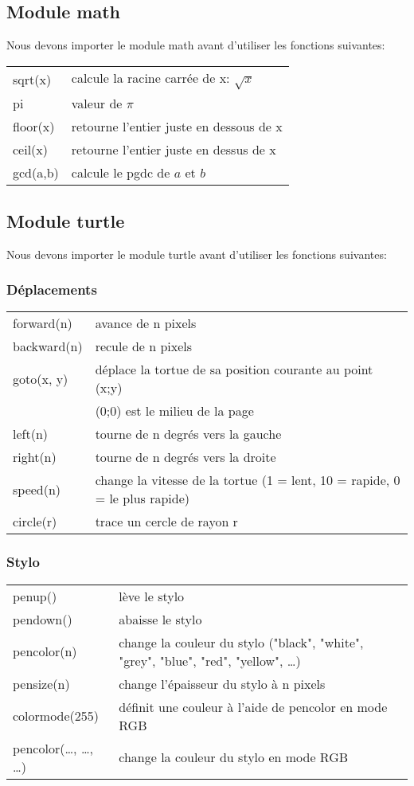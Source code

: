\documentclass[a4paper,11pt]{article}
\begin{document}
\subsection{Module math}
Nous devons importer le module math avant d'utiliser les fonctions suivantes:\par
\begin{tabular}{l l}
sqrt(x) & calcule la racine carrée de x: $\sqrt{x}$\\
pi & valeur de $\pi$\\
floor(x) & retourne l'entier juste en dessous de x\\
ceil(x) & retourne l'entier juste en dessus de x\\
gcd(a,b) & calcule le pgdc de $a$ et $b$\\
\end{tabular}

\subsection{Module turtle}
Nous devons importer le module turtle avant d'utiliser les fonctions suivantes:\par
\subsubsection{Déplacements}
\begin{tabular}{l l}
forward(n) & avance de n pixels\\
backward(n) & recule de n pixels\\
goto(x, y) & déplace la tortue de sa position courante au point (x;y)\\
& (0;0) est le milieu de la page\\
left(n) & tourne de n degrés vers la gauche\\
right(n) & tourne de n degrés vers la droite\\
speed(n) & change la vitesse de la tortue (1 = lent, 10 = rapide, 0 = le plus rapide)\\
circle(r) & trace un cercle de rayon r\\
\end{tabular}


\subsubsection{Stylo}
\begin{tabular}{l l}
penup() & lève le stylo\\
pendown() & abaisse le stylo\\
pencolor(n) & change la couleur du stylo ("black", "white", "grey", "blue",  "red", "yellow", …)\\
pensize(n)  & change l'épaisseur du stylo à n pixels\\
colormode(255) & définit une couleur à l'aide de pencolor en mode RGB\\
pencolor(…, …, …) & change la couleur du stylo en mode RGB \\
\end{tabular}
\end{document}
